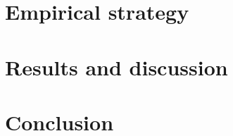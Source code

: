 \section{Empirical strategy}


\section{Results and discussion}


\section{Conclusion}


\clearpage
\printbibliography
\clearpage

\appendix
\renewcommand\thefigure{\thesection.\arabic{figure}}
\setcounter{figure}{0}
\setcounter{page}{1}



\clearpage


